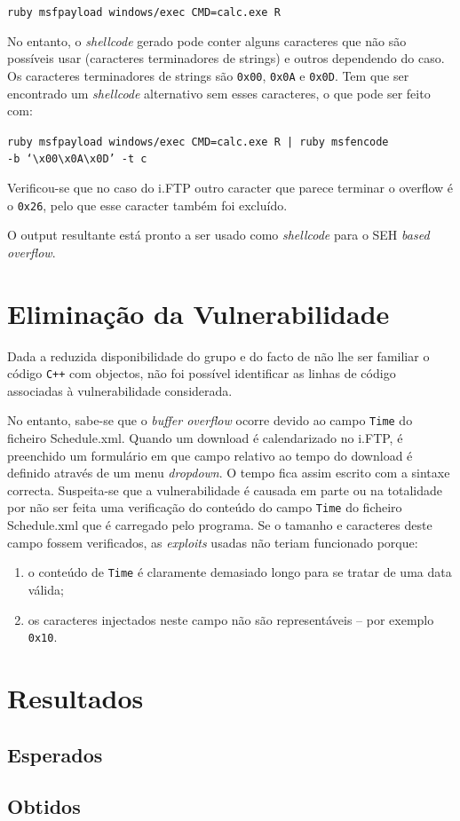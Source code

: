 \documentclass[a4paper]{article}
\begin{document}
	\texttt{ruby msfpayload windows/exec CMD=calc.exe R}

No entanto, o \textit{shellcode} gerado pode conter alguns caracteres que não são possíveis usar (caracteres terminadores de strings) e outros dependendo do caso. Os caracteres terminadores de strings são \texttt{0x00}, \texttt{0x0A} e \texttt{0x0D}. Tem que ser encontrado um \textit{shellcode} alternativo sem esses caracteres, o que pode ser feito com:

	\texttt{ruby msfpayload windows/exec CMD=calc.exe R | ruby msfencode \\ -b `\textbackslash x00\textbackslash x0A\textbackslash x0D' -t c}

Verificou-se que no caso do i.FTP outro caracter que parece terminar o overflow é o \texttt{0x26}, pelo que esse caracter também foi excluído.

O output resultante está pronto a ser usado como \textit{shellcode} para o SEH \textit{based overflow}.


\section{Eliminação da Vulnerabilidade}

Dada a reduzida disponibilidade do grupo e do facto de não lhe ser familiar o código \texttt{C++} com objectos, não foi possível identificar as linhas de código associadas à vulnerabilidade considerada.

No entanto, sabe-se que o \textit{buffer overflow} ocorre devido ao campo \texttt{Time} do ficheiro Schedule.xml. Quando um download é calendarizado no i.FTP, é preenchido um formulário em que campo relativo ao tempo do download é definido através de um menu \textit{dropdown}. O tempo fica assim escrito com a sintaxe correcta. Suspeita-se que a vulnerabilidade é causada em parte ou na totalidade por não ser feita uma verificação do conteúdo do campo \texttt{Time} do ficheiro Schedule.xml que é carregado pelo programa. Se o tamanho e caracteres deste campo fossem verificados, as \textit{exploits} usadas não teriam funcionado porque:

\begin{enumerate}
	\item o conteúdo de \texttt{Time} é claramente demasiado longo para se tratar de uma data válida;
	\item os caracteres injectados neste campo não são representáveis -- por exemplo \texttt{0x10}.
\end{enumerate}

\pagebreak
\section{Resultados}



\subsection{Esperados}
\subsection{Obtidos}


\pagebreak

\nocite{CorelanTeam, refx86asm, genSEHexploits, AMD64vol3_2013}
\end{document}
